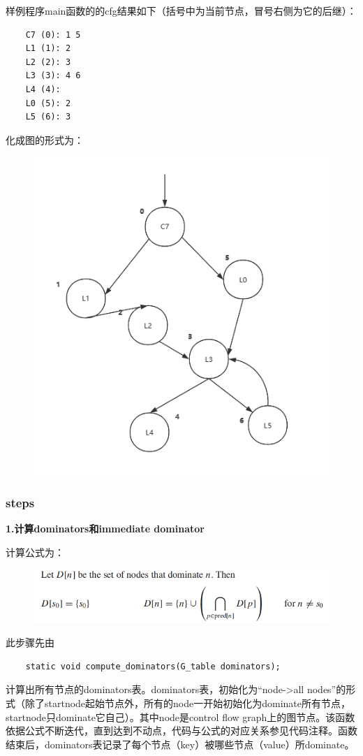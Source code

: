 \documentclass{article}
\begin{document}
样例程序main函数的的cfg结果如下（括号中为当前节点，冒号右侧为它的后继）：

\begin{lstlisting}
    C7 (0): 1 5 
    L1 (1): 2 
    L2 (2): 3 
    L3 (3): 4 6 
    L4 (4): 
    L0 (5): 2 
    L5 (6): 3 
\end{lstlisting}

化成图的形式为：

\begin{figure}[h]
  \centering
  \includegraphics[width=.5\linewidth]{pics/cfg.jpg}
  \label{fig:cfg}
\end{figure}

\subsubsection{steps}
\textbf{1.计算dominators和immediate dominator}

计算公式为：
\begin{figure}[h]
  \centering
  \includegraphics[width=.9\linewidth]{pics/dominators.jpg}
  \label{fig:dom_theory}
\end{figure}

此步骤先由

    \begin{lstlisting}
    static void compute_dominators(G_table dominators);
    \end{lstlisting}
    
计算出所有节点的dominators表。dominators表，初始化为“node->all nodes”的形式（除了startnode起始节点外，所有的node一开始初始化为dominate所有节点，startnode只dominate它自己）。其中node是control flow graph上的图节点。该函数依据公式不断迭代，直到达到不动点，代码与公式的对应关系参见代码注释。函数结束后，dominators表记录了每个节点（key）被哪些节点（value）所dominate。
\end{document}
